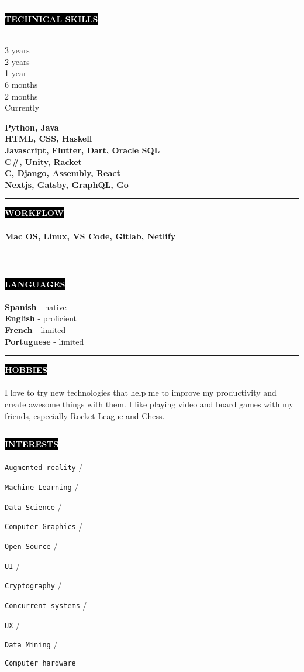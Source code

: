 \documentclass[10pt,A4]{article}
\newcounter{a}
\newcounter{b}
\newcounter{c}
\newcommand{\cvsection}[1] {
	\textcolor{white}{\MakeUppercase{\textbf{#1}}}
}
\newcommand{\cvsect}[1]{
	\colorbox{black}{{\cvsection{#1}}}\\\\%
}
\newcommand{\slashsep}{
	\hspace{2mm}/\hspace{2mm}
}
\begin{document}
	

	\begin{minipage}[t]{0.5\textwidth}\hrule height 0pt width 0pt%
	\cvsect{Technical Skills}
	\begin{minipage}[t]{0.3\textwidth}%
		3 years\\ 2 years \\ 1 year \\ 6 months \\ 2 months \\ Currently
	\end{minipage}%
	\begin{minipage}[t]{0.7\textwidth}%
		\textbf{Python, Java}\\ \textbf{HTML, CSS, Haskell} \\ \textbf{Javascript, Flutter, Dart, Oracle SQL} \\ \textbf{C\#, Unity, Racket} \\ \textbf{C, Django, Assembly, React} \\ \textbf{Nextjs, Gatsby, GraphQL, Go}
	\end{minipage}%
	\end{minipage}%
	\hspace{1cm}
	\begin{minipage}[t]{0.45\textwidth}\hrule height 0pt width 0pt%
		\cvsect{Workflow}
		\textbf{Mac OS, Linux, VS Code, Gitlab, Netlify}
	\end{minipage}%
	\hspace{2cm}
	\\
	



	
	\begin{minipage}[t]{0.3\textwidth}\hrule height 0pt width 0pt%
		\cvsect{Languages}
		\textbf{Spanish} - native\\
		\textbf{English} - proficient\\
		\textbf{French} - limited\\
		\textbf{Portuguese} - limited\\
	\end{minipage}%
	\hspace{0cm}
	\begin{minipage}[t]{0.3\textwidth}\hrule height 0pt width 0pt%
		\cvsect{Hobbies}
		I love to try new technologies that help me to improve my productivity and create awesome things with them. 
		I like playing video and board games with my friends, especially Rocket League and Chess.
	\end{minipage}%
	\hspace{2cm}
	\begin{minipage}[t]{0.3\textwidth}\hrule height 0pt width 0pt%
		\cvsect{Interests}
		\texttt{Augmented reality}\slashsep
		\texttt{Machine Learning}\slashsep
		\texttt{Data Science}\slashsep
		\texttt{Computer Graphics}\slashsep
		\texttt{Open Source}\slashsep
		\texttt{UI}\slashsep
		\texttt{Cryptography}\slashsep
		\texttt{Concurrent systems}\slashsep
		\texttt{UX}\slashsep
		\texttt{Data Mining} \slashsep
		\texttt{Computer hardware}

		
	\end{minipage}%
	
\end{document}
